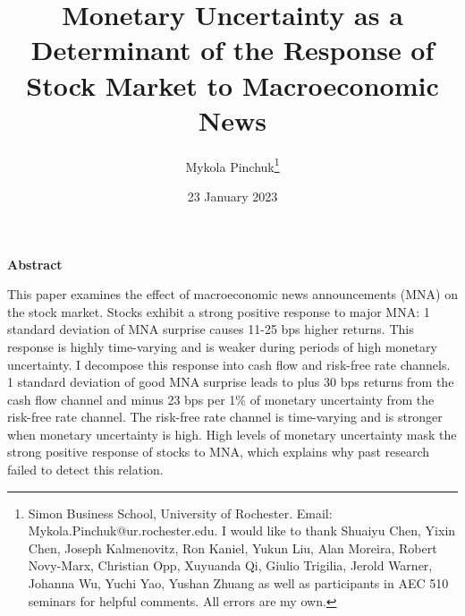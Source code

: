 \documentclass[12pt]{article}
\begin{document}
\onehalfspacing      %
\renewcommand{\footnote}{\endnote}  %

\author{\large{Mykola Pinchuk}\thanks{\rm Simon Business School, University of Rochester. Email: Mykola.Pinchuk@ur.rochester.edu. \newline I would like to thank Shuaiyu Chen, Yixin Chen, Joseph Kalmenovitz, Ron Kaniel, Yukun Liu, Alan Moreira, Robert Novy-Marx, Christian Opp, Xuyuanda Qi, Giulio Trigilia, Jerold Warner, Johanna Wu, Yuchi Yao, Yushan Zhuang as well as participants in AEC 510 seminars for helpful comments. All errors are my own.}}

\title{\bf Monetary Uncertainty as a Determinant of the Response of Stock Market to Macroeconomic News}

\date{23 January 2023}  

\maketitle
\thispagestyle{empty}

\bigskip

\normalsize

\vspace{1cm}

\centerline{\bf Abstract}

\vspace{0.5cm}

\begin{onehalfspace}  %
  \noindent This paper examines the effect of macroeconomic news announcements (MNA) on the stock market. Stocks exhibit a strong positive response to major MNA: 1 standard deviation of MNA surprise causes 11-25 bps higher returns. This response is highly time-varying and is weaker during periods of high monetary uncertainty. I decompose this response into cash flow and risk-free rate channels. 1 standard deviation of good MNA surprise leads to plus 30 bps returns from the cash flow channel and minus 23 bps per 1\% of monetary uncertainty from the risk-free rate channel. The risk-free rate channel is time-varying and is stronger when monetary uncertainty is high. High levels of monetary uncertainty mask the strong positive response of stocks to MNA, which explains why past research failed to detect this relation.  
\end{onehalfspace}
\medskip
\end{document}
